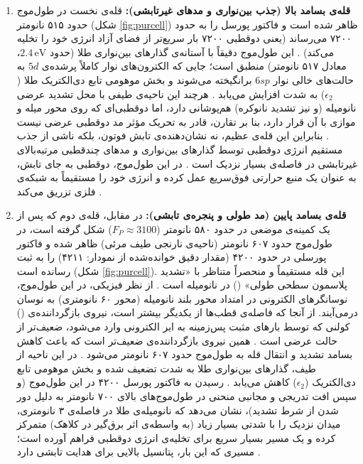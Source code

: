 \documentclass[12pt,a4paper]{report}
\begin{document}
\begin{enumerate}
\item \textbf{قله‌ی بسامد بالا (جذب بین‌نواری و مدهای غیرتابشی):} قله‌ی نخست در طول‌موج حدود ۵۱۵ نانومتر (شکل \ref{fig:purcell}) ظاهر شده است و فاکتور پورسل را به حدود ۷۲۰۰ می‌رساند (یعنی دوقطبی ۷۲۰۰ بار سریع‌تر از فضای آزاد انرژی خود را تخلیه می‌کند) \cite{novotny}. این طول‌موج دقیقاً با آستانه‌ی گذارهای بین‌نواری طلا (حدود $2.4\,\mathrm{eV}$، معادل ۵۱۷ نانومتر) منطبق است؛ جایی که الکترون‌های نوار کاملاً پرشده‌ی $5d$ به حالت‌های خالی نوار $6sp$ برانگیخته می‌شوند و بخش موهومی تابع دی‌الکتریک طلا ($\epsilon_2$) به شدت افزایش می‌یابد \cite{maier,jc}. هرچند این ناحیه‌ی طیفی با محل تشدید عرضی نانومیله (و نیز تشدید نانوکره) هم‌پوشانی دارد، اما دوقطبی‌ای که روی محور میله و موازی با آن قرار دارد، بنا بر تقارن، قادر به تحریک مؤثر مد دوقطبی عرضی نیست \cite{maier}. بنابراین این قله‌ی عظیم، نه نشان‌دهنده‌ی تابش فوتون، بلکه ناشی از جذب مستقیم انرژی دوقطبی توسط گذارهای بین‌نواری و مدهای چندقطبی مرتبه‌بالای غیرتابشی در فاصله‌ی بسیار نزدیک است \cite{novotny,koenderink,ruppin}. در این طول‌موج، دوقطبی به جای تابش، به عنوان یک منبع حرارتی فوق‌سریع عمل کرده و انرژی خود را مستقیماً به شبکه‌ی فلزی تزریق می‌کند \cite{maier}.

\item \textbf{قله‌ی بسامد پایین (مد طولی و پنجره‌ی تابشی):} در مقابل، قله‌ی دوم که پس از یک کمینه‌ی موضعی در حدود ۵۸۰ نانومتر ($F_P\approx3100$) شکل گرفته است، در طول‌موج حدود ۶۰۷ نانومتر (ناحیه‌ی نارنجی طیف مرئی) ظاهر شده و فاکتور پورسلی در حدود ۴۲۰۰ (مقدار دقیق خوانده‌شده از نمودار: ۴۲۱۱) را به ثبت رسانده است (شکل \ref{fig:purcell}). این قله مستقیماً و منحصراً متناظر با «تشدید پلاسمون سطحی طولی» () در نانومیله است \cite{maier,novotny}. از نظر فیزیکی، در این طول‌موج، نوسانگرهای الکترونی در امتداد محور بلند نانومیله (محور ۶۰ نانومتری) به نوسان درمی‌آیند. از آنجا که فاصله‌ی قطب‌ها از یکدیگر بیشتر است، نیروی بازگرداننده‌ی () کولنی که توسط بارهای مثبت پس‌زمینه به ابر الکترونی وارد می‌شود، ضعیف‌تر از حالت عرضی است \cite{maier}. همین نیروی بازگرداننده‌ی ضعیف‌تر است که باعث کاهش بسامد تشدید و انتقال قله به طول‌موج حدود ۶۰۷ نانومتر می‌شود \cite{maier}. در این ناحیه از طیف، گذارهای بین‌نواری طلا به شدت تضعیف شده و بخش موهومی تابع دی‌الکتریک ($\epsilon_2$) کاهش می‌یابد \cite{maier,jc}. رسیدن به فاکتور پورسل ۴۲۰۰ در این طول‌موج (و سپس افت تدریجی و مجانبی منحنی در طول‌موج‌های بالای ۷۰۰ نانومتر به دلیل دور شدن از شرط تشدید)، نشان می‌دهد که نانومیله‌ی طلا در فاصله‌ی ۳ نانومتری، میدان نزدیک را با شدتی بسیار زیاد (به واسطه‌ی اثر برق‌گیر در کلاهک) متمرکز کرده و یک مسیر بسیار سریع برای تخلیه‌ی انرژی دوقطبی فراهم آورده است؛ مسیری که این بار، پتانسیل بالایی برای هدایت تابشی دارد \cite{novotny,bharadwaj}.
\end{enumerate}
\end{document}
